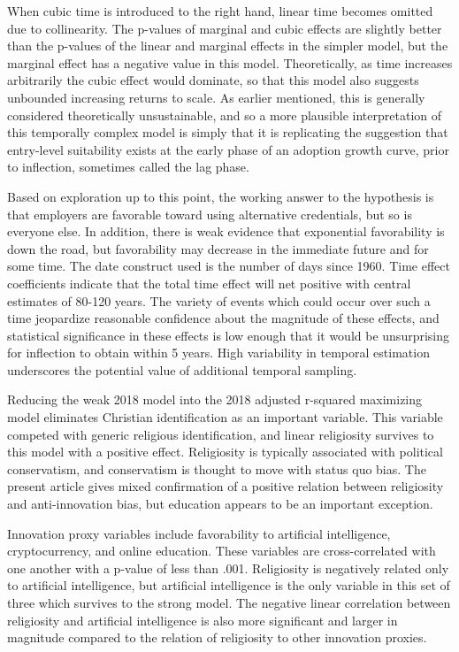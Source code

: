 \documentclass[AER]{/Users/zyl357/Documents/GitHub/research-dissertation-case-for-alt-ed/papers/alt-ed-survey/aea-latex-templates/AEA}
\begin{document}
When cubic time is introduced to the right hand, linear time becomes
omitted due to collinearity. The p-values of marginal and cubic effects
are slightly better than the p-values of the linear and marginal effects
in the simpler model, but the marginal effect has a negative value in this
model. Theoretically, as time increases arbitrarily the cubic effect would
dominate, so that this model also suggests unbounded increasing returns to
scale. As earlier mentioned, this is generally considered theoretically
unsustainable, and so a more plausible interpretation of this temporally
complex model is simply that it is replicating the suggestion that
entry-level suitability exists at the early phase of an adoption growth
curve, prior to inflection, sometimes called the lag phase.

Based on exploration up to this point, the working answer to the
hypothesis is that employers are favorable toward using alternative
credentials, but so is everyone else. In addition, there is weak evidence
that exponential favorability is down the road, but favorability may
decrease in the immediate future and for some time. The date construct
used is the number of days since 1960. Time effect coefficients indicate
that the total time effect will net positive with central estimates of
80-120 years. The variety of events which could occur over such a time
jeopardize reasonable confidence about the magnitude of these effects, and
statistical significance in these effects is low enough that it would be
unsurprising for inflection to obtain within 5 years. High variability in
temporal estimation underscores the potential value of additional temporal
sampling.

Reducing the weak 2018 model into the 2018 adjusted r-squared maximizing
model eliminates Christian identification as an important variable. This
variable competed with generic religious identification, and linear
religiosity survives to this model with a positive effect. Religiosity is
typically associated with political conservatism, and conservatism is
thought to move with status quo bias. The present article gives mixed
confirmation of a positive relation between religiosity and
anti-innovation bias, but education appears to be an important exception.

Innovation proxy variables include favorability to artificial
intelligence, cryptocurrency, and online education. These variables are
cross-correlated with one another with a p-value of less than .001.
Religiosity is negatively related only to artificial intelligence, but
artificial intelligence is the only variable in this set of three which
survives to the strong model. The negative linear correlation between
religiosity and artificial intelligence is also more significant and
larger in magnitude compared to the relation of religiosity to other
innovation proxies.
\end{document}
